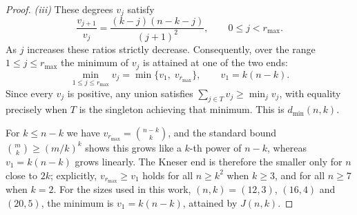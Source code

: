 \begin{proof}
\medskip
\emph{(iii)}
These degrees $v_j$ satisfy
\begin{equation}
    \frac{v_{j+1}}{v_j}=\frac{(k-j)(n-k-j)}{(j+1)^{2}},
    \qquad 0\le j<r_{\max}.
    \label{eq:ratio}
\end{equation}
As $j$ increases these ratios
strictly decrease. Consequently, over the range
$1\le j\le r_{\max}$ the minimum of $v_j$ is attained at one of the two
ends:
\begin{equation*}
  \min_{1\le j\le r_{\max}} v_j
  =\min\bigl\{v_1,\;v_{r_{\max}}\bigr\},
  \qquad v_1=k(n-k).
\end{equation*}
Since every $v_j$ is positive, any union satisfies
$\sum_{j\in T}v_j\ge\min_j v_j$, with equality precisely when $T$ is the
singleton achieving that minimum. This is $d_{\min}(n,k)$.

\medskip
For $k\le n-k$ we have $v_{r_{\max}}=\binom{n-k}{k}$, and the standard
bound $\binom{m}{k}\ge(m/k)^{k}$ shows this grows like a $k$-th power of
$n-k$, whereas $v_1=k(n-k)$ grows linearly. The Kneser end is therefore
the smaller only for $n$ close to $2k$; explicitly, $v_{r_{\max}}\ge v_1$
holds for all $n\ge k^{2}$ when $k\ge3$, and for all $n\ge7$ when $k=2$.
For the sizes used in this work, $(n,k)=(12,3)$, $(16,4)$ and $(20,5)$, the
minimum is $v_1=k(n-k)$, attained by $J(n,k)$.
\end{proof}

%

\newcommand{\FeasibleCoords}{%
  \coordinate (va) at (90:1.55);   %
  \coordinate (vb) at (30:1.55);   %
  \coordinate (vc) at (-30:1.55);  %
  \coordinate (vd) at (-90:1.55);  %
  \coordinate (ve) at (-150:1.55); %
  \coordinate (vf) at (150:1.55);  %
}
\newcommand{\FeasibleLabels}{%
  \node[glab] at (90:2.02)   {1100};
  \node[glab] at (30:2.02)   {0101};
  \node[glab] at (-30:2.02)  {1001};
  \node[glab] at (-90:2.02)  {0011};
  \node[glab] at (-150:2.02) {1010};
  \node[glab] at (150:2.02)  {0110};
}
\newcommand{\FeasibleDots}{%
  \foreach \v in {va,vb,vc,vd,ve,vf} \node[gvert] at (\v) {};
}

